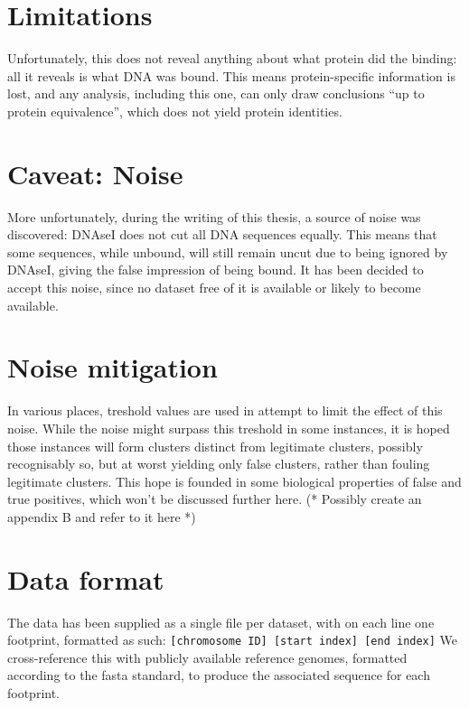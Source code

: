 \documentclass[fleqn]{book}
\begin{document}
\section{Limitations}\label{limitations}

Unfortunately, this does not reveal anything about what protein did the
binding: all it reveals is what DNA was bound. This means
protein-specific information is lost, and any analysis, including this
one, can only draw conclusions ``up to protein equivalence'', which does
not yield protein identities.

\section{Caveat: Noise}\label{caveat-noise}

More unfortunately, during the writing of this thesis, a source of noise
was discovered: DNAseI does not cut all DNA sequences equally. This
means that some sequences, while unbound, will still remain uncut due to
being ignored by DNAseI, giving the false impression of being bound. It
has been decided to accept this noise, since no dataset free of it is
available or likely to become available.

\section{Noise mitigation}\label{noise-mitigation}

In various places, treshold values are used in attempt to limit the
effect of this noise. While the noise might surpass this treshold in
some instances, it is hoped those instances will form clusters distinct
from legitimate clusters, possibly recognisably so, but at worst
yielding only false clusters, rather than fouling legitimate clusters.
This hope is founded in some biological properties of false and true
positives, which won't be discussed further here. (* Possibly create an
appendix B and refer to it here *)

\section{Data format}\label{data-format}

The data has been supplied as a single file per dataset, with on each
line one footprint, formatted as such:
\texttt{{[}chromosome\ ID{]}\ {[}start\ index{]}\ {[}end\ index{]}} We
cross-reference this with publicly available reference genomes,
formatted according to the fasta standard, to produce the associated
sequence for each footprint.
\end{document}
